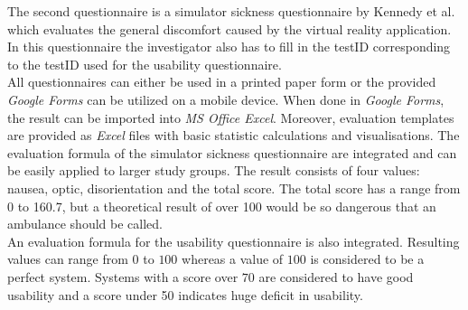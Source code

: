 The second questionnaire is a simulator sickness questionnaire by Kennedy et al. \citep{ssq} which evaluates the general discomfort caused by the virtual reality application. In this questionnaire the investigator also has to fill in the testID corresponding to the testID used for the usability questionnaire.  \\

All questionnaires can either be used in a printed paper form or the provided \textit{Google Forms} can be utilized on a mobile device. When done in \textit{Google Forms}, the result can be imported into \textit{MS Office Excel}. Moreover, evaluation templates are provided as \textit{Excel} files with basic statistic calculations and visualisations. The evaluation formula of the simulator sickness questionnaire are integrated and can be easily applied to larger study groups. The result consists of four values: nausea, optic, disorientation and the total score. The total score has a range from 0 to 160.7, but a theoretical result of over 100 would be so dangerous that an ambulance should be called. \\
An evaluation formula for the usability questionnaire is also integrated. Resulting values can range from $0$ to $100$ whereas a value of $100$ is considered to be a perfect system. Systems with a score over $70$ are considered to have good usability and a score under 50 indicates huge deficit in usability. 

\newpage